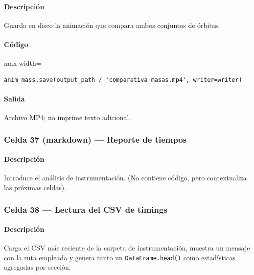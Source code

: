 \paragraph{Descripción} Guarda en disco la animación que compara ambos conjuntos de órbitas.
\paragraph{Código}
\begin{listing}[H]
\caption{Celda 36: escritura de \texttt{comparativa\_masas.mp4}}
\label{lst:c04_cell36}
\begin{adjustbox}{max width=\textwidth}
\begin{minipage}{\textwidth}
\begin{verbatim}
anim_mass.save(output_path / 'comparativa_masas.mp4', writer=writer)
\end{verbatim}
\end{minipage}
\end{adjustbox}
\end{listing}
\paragraph{Salida} Archivo MP4; no imprime texto adicional.

\subsubsection*{Celda 37 (markdown) — Reporte de tiempos}
\paragraph{Descripción} Introduce el análisis de instrumentación. (No contiene código, pero contextualiza las próximas celdas).

\subsubsection*{Celda 38 — Lectura del CSV de timings}
\paragraph{Descripción} Carga el CSV más reciente de la carpeta de instrumentación, muestra un mensaje con la ruta empleada y genera tanto un \texttt{DataFrame.head()} como estadísticas agregadas por sección.
